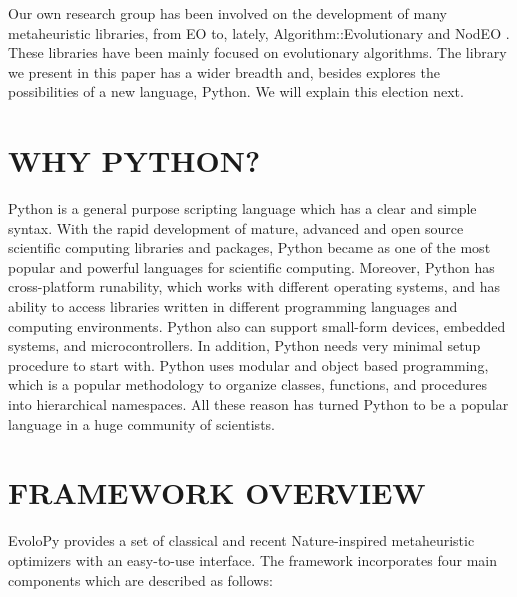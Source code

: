 \documentclass[a4paper,twoside]{article}
\begin{document}
Our own research group has been involved on the development of many
metaheuristic libraries, from EO \cite{EO:FEA2000} to, lately, {\sf
  Algorithm::Evolutionary} \cite{ae09} and NodEO
\cite{nodeo2014}. These libraries have been mainly focused on
evolutionary algorithms. The library we present in this paper has a
wider breadth and, besides explores the possibilities of a new
language, Python. We will explain this election next. 


\section{\uppercase{Why Python?}}

Python is a general purpose scripting language which has a clear and simple syntax. With the rapid development of mature, advanced  and open source scientific computing libraries and packages, Python became as one of the most popular and powerful languages for scientific computing.
Moreover, Python has cross-platform runability, which works with different operating systems, and has ability to access libraries written in different programming languages and computing environments. Python also can support small-form devices, embedded systems, and microcontrollers. In addition, Python needs very minimal setup procedure to start with. Python uses modular and object based programming, which is a popular methodology to organize classes, functions, and procedures into hierarchical namespaces. All these reason has turned Python to be a popular language in a huge community of scientists. 

\section{\uppercase{Framework Overview}}

EvoloPy provides a set of classical and recent Nature-inspired metaheuristic optimizers with an easy-to-use interface. The framework incorporates four main components which are described as follows: 
\end{document}
